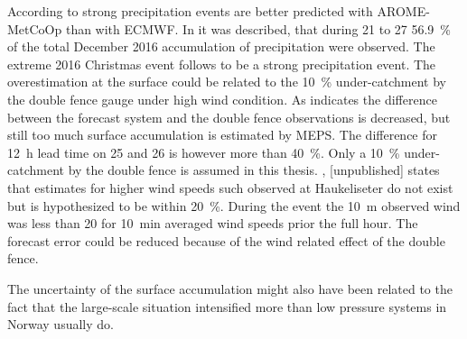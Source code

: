 According to \citet{muller_arome-metcoop:_2017} strong precipitation events are better predicted with AROME-MetCoOp than with ECMWF. In  it was described, that during \num{21} to \SI{27}{\dec} \SI{56.9}{\percent} of the total December 2016 accumulation of precipitation were observed. The extreme 2016 Christmas event follows to be a strong precipitation event. 
The overestimation at the surface could be related to the \SI{10}{\percent} under-catchment by the double fence gauge under high wind condition. As  indicates the difference between the forecast system and the double fence observations is decreased, but still too much surface accumulation is estimated by MEPS. The difference for \SI{12}{\hour} lead time on \num{25} and \SI{26}{\dec} is however more than \SI{40}{\percent}. Only a \SI{10}{\percent} under-catchment by the double fence is assumed in this thesis. 
\citet{wolff_wmo_2018}, [unpublished] states that estimates for higher wind speeds such observed at Haukeliseter do not exist but is hypothesized to be within \SI{20}{\percent}. During the event the \SI{10}{\metre} observed wind was less than \SI{20}{\mPs} for \SI{10}{\minute} averaged wind speeds prior the full hour.
The forecast error could be reduced because of the wind related effect of the double fence.
\par\medskip\noindent
The uncertainty of the surface accumulation might also have been related to the fact that the large-scale situation intensified more than low pressure systems in Norway usually do. 
